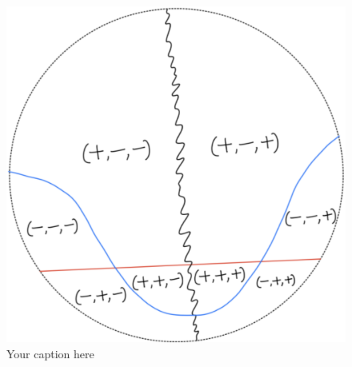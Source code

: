 \begin{figure}[H] 
    \centering
    \includegraphics[scale = 0.95]{diagrams/lemma1/4.png} 
    \caption{Your caption here}
    \label{fig:your-label}
\end{figure}